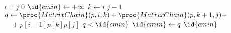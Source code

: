 \begin{codebox}
\li \If $i = j$
\li \Then \Return $0$
\li \Else
\li     $\id{cmin} \gets +\infty$
\li     \For $k \gets i$ \To $j-1$
\li     \Do 
            $q \gets \proc{MatrixChain}(p,i,k) + \proc{MatrixChain}(p,k+1,j) + $
\zi         $\quad + p[i-1]p[k]p[j]$
\li         \If $q < \id{cmin}$
\li         \Then $\id{cmin} \gets q$
            \End
        \End
    \End
\li \Return $\id{cmin}$
\end{codebox}